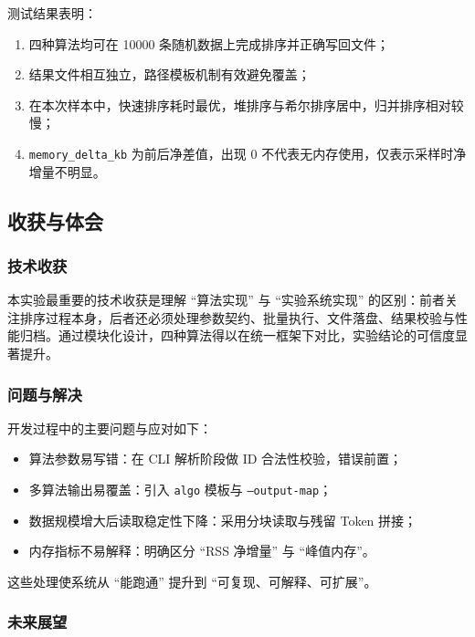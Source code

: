 \documentclass[12pt, a4paper]{ctexart}
\begin{document}
测试结果表明：

\begin{enumerate}
    \item 四种算法均可在 10000 条随机数据上完成排序并正确写回文件；
    \item 结果文件相互独立，路径模板机制有效避免覆盖；
    \item 在本次样本中，快速排序耗时最优，堆排序与希尔排序居中，归并排序相对较慢；
    \item \texttt{memory_delta_kb} 为前后净差值，出现 0 不代表无内存使用，仅表示采样时净增量不明显。
\end{enumerate}

\subsection{收获与体会}

\subsubsection{技术收获}

本实验最重要的技术收获是理解 ``算法实现'' 与 ``实验系统实现'' 的区别：前者关注排序过程本身，后者还必须处理参数契约、批量执行、文件落盘、结果校验与性能归档。通过模块化设计，四种算法得以在统一框架下对比，实验结论的可信度显著提升。

\subsubsection{问题与解决}

开发过程中的主要问题与应对如下：

\begin{itemize}
    \item 算法参数易写错：在 CLI 解析阶段做 ID 合法性校验，错误前置；
    \item 多算法输出易覆盖：引入 \texttt{{algo}} 模板与 \texttt{--output-map}；
    \item 数据规模增大后读取稳定性下降：采用分块读取与残留 Token 拼接；
    \item 内存指标不易解释：明确区分 ``RSS 净增量'' 与 ``峰值内存''。
\end{itemize}

这些处理使系统从 ``能跑通'' 提升到 ``可复现、可解释、可扩展''。

\subsubsection{未来展望}
\end{document}
